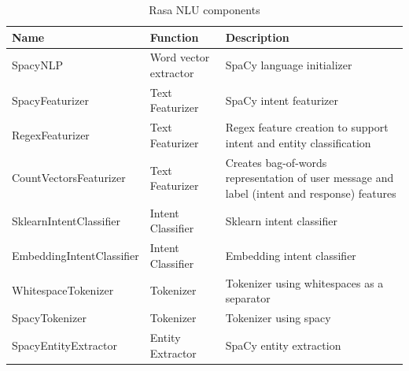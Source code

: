 \begin{table}
\caption{Rasa NLU components}
\centering
\begin{tabular}{p{5cm}|p{4cm}|p{8cm}}
Name                                                                   & Function              & Description                                                                                                              \\ 
\hline
SpacyNLP                                                               & Word vector extractor & SpaCy language initializer                                                                                               \\
SpacyFeaturizer                                                        & Text Featurizer       & SpaCy intent featurizer                                                                                                  \\
RegexFeaturizer                                                        & Text Featurizer       & Regex feature creation to support intent and entity classification                                                       \\
CountVectorsFeaturizer                                                 & Text Featurizer       & Creates bag-of-words representation of user message and label (intent and response) features                             \\
SklearnIntentClassifier                                                & Intent Classifier     & Sklearn intent classifier                                                                                                \\
EmbeddingIntentClassifier                                              & Intent Classifier    & Embedding intent classifier                                                                                              \\
WhitespaceTokenizer                                                    & Tokenizer             & Tokenizer using whitespaces as a separator                                                                               \\
SpacyTokenizer                                                         & Tokenizer             & Tokenizer using spacy                                                                                                    \\
SpacyEntityExtractor                                                   & Entity Extractor      & SpaCy entity extraction                                                                                                  \\

\end{tabular}
\end{table}

